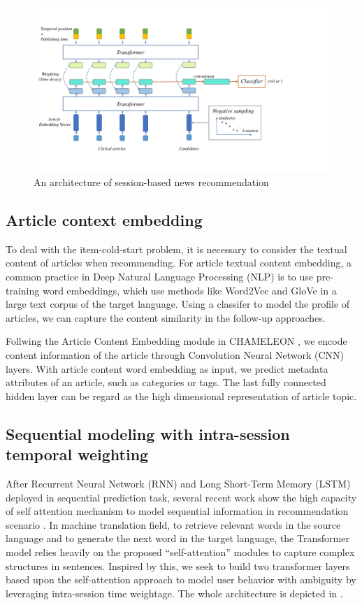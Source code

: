 \begin{figure}[!htp]
    \centering
    \includegraphics[width=12cm]{fig/architecture.pdf}
    \caption{An architecture of session-based news recommendation}
    \label{fig:architecture}
\end{figure}
\subsection{Article context embedding}
\label{sec:3.1}
To deal with the item-cold-start problem, it is necessary to consider the textual content of articles when recommending. For article textual content embedding, a common practice in Deep Natural Language Processing (NLP) is to use pre-training word embeddings, which use methods like Word2Vec and GloVe in a large text corpus of the target language. Using a classifer to model the profile of articles, we can capture the content similarity in the follow-up approaches.

Follwing the Article Content Embedding module in CHAMELEON \cite{moreira_importance_2019}, we encode content information of the article through Convolution Neural Network (CNN) layers. With article content word embedding as input, we predict metadata attributes of an article, such as categories or tags. The last fully connected hidden layer can be regard as the high dimensional representation of article topic. 

\subsection{Sequential modeling with intra-session temporal weighting}
After Recurrent Neural Network (RNN) and Long Short-Term Memory (LSTM) \cite{guo_streaming_2019, hidasi2015session, wang2019modeling} deployed in sequential prediction task, several recent work show the high capacity of self attention mechanism to model sequential information in recommendation scenario \cite{kang_self-attentive_2018, liu2018stamp, xu2019time}.
\label{sec:3.2}
In machine translation field, to retrieve relevant words in the source language and to generate the next word in the target language, the Transformer model relies heavily on the proposed ``self-attention'' modules to capture complex structures in sentences. Inspired by this, we seek to build two transformer layers based upon the self-attention approach to model user behavior with ambiguity by leveraging intra-session time weightage. The whole architecture is depicted in .
